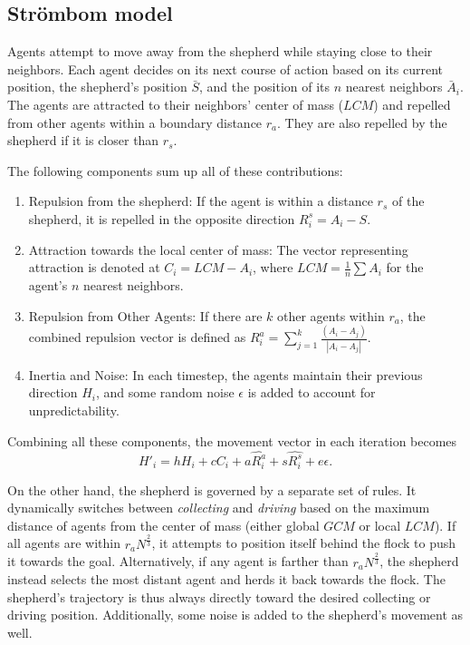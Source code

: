 \documentclass[9pt]{pnas-new}
\begin{document}
\subsection{Str\"{o}mbom model}
Agents attempt to move away from the shepherd while staying close to their neighbors. Each agent decides on its next course of action based on its current position, the shepherd's position $\bar{S}$, and the position of its $n$ nearest neighbors $\bar{A}_{i}$. The agents are attracted to their neighbors' center of mass ($LCM$) and repelled from other agents within a boundary distance $r_a$. They are also repelled by the shepherd if it is closer than $r_s$.

The following components sum up all of these contributions:
\begin{enumerate}
    \item Repulsion from the shepherd:
    If the agent is within a distance $r_s$ of the shepherd, it is repelled in the opposite direction $R^s_i = A_i - S$.
    
    \item Attraction towards the local center of mass:
    The vector representing attraction is denoted at $C_i = LCM - A_i$, where $LCM = \frac{1}{n}\sum A_i$ for the agent's $n$ nearest neighbors.
    
    \item Repulsion from Other Agents:
    If there are $k$ other agents within $r_a$, the combined repulsion vector is defined as $R^a_i = \sum^k_{j=1} \frac{(A_i - A_j)}{|A_i - A_j|}$.
    
    \item Inertia and Noise:
    In each timestep, the agents maintain their previous direction $H_i$, and some random noise $\epsilon$ is added to account for unpredictability.
\end{enumerate}
Combining all these components, the movement vector in each iteration becomes $$H'_i = h H_i + c C_i + a \hat{R_i^a} + s \hat{R_i^s} + e \epsilon.$$

On the other hand, the shepherd is governed by a separate set of rules. It dynamically switches between \textit{collecting} and \textit{driving} based on the maximum distance of agents from the center of mass (either global $GCM$ or local $LCM$). If all agents are within $r_aN^\frac{2}{3}$, it attempts to position itself behind the flock to push it towards the goal. Alternatively, if any agent is farther than $r_aN^{\frac{2}{3}}$, the shepherd instead selects the most distant agent and herds it back towards the flock. The shepherd's trajectory is thus always directly toward the desired collecting or driving position. Additionally, some noise is added to the shepherd's movement as well.
\end{document}

